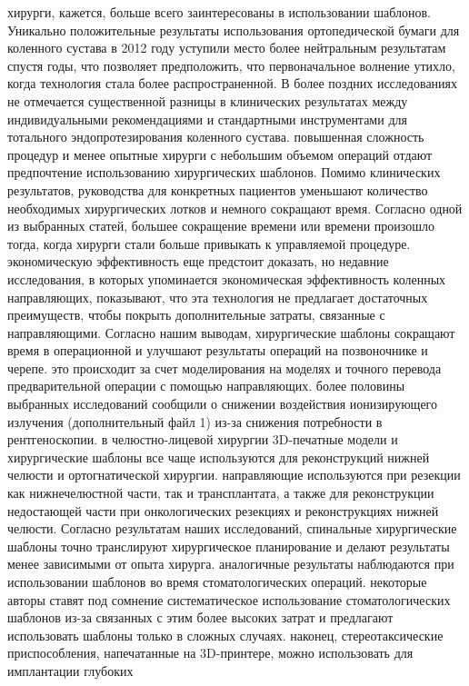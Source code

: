хирурги, кажется, больше всего заинтересованы в использовании шаблонов.
Уникально положительные результаты использования ортопедической бумаги для
коленного сустава в 2012 году уступили место более нейтральным результатам
спустя годы, что позволяет предположить, что первоначальное волнение утихло,
когда технология стала более распространенной. В более поздних исследованиях не
отмечается существенной разницы в клинических результатах между индивидуальными
рекомендациями и стандартными инструментами для тотального эндопротезирования
коленного сустава. повышенная сложность процедур и менее опытные хирурги с
небольшим объемом операций отдают предпочтение использованию хирургических
шаблонов. Помимо клинических результатов, руководства для конкретных пациентов
уменьшают количество необходимых хирургических лотков и немного сокращают время.
Согласно одной из выбранных статей, большее сокращение времени или времени
произошло тогда, когда хирурги стали больше привыкать к управляемой процедуре.
экономическую эффективность еще предстоит доказать, но недавние исследования, в
которых упоминается экономическая эффективность коленных направляющих,
показывают, что эта технология не предлагает достаточных преимуществ, чтобы
покрыть дополнительные затраты, связанные с направляющими. Согласно нашим
выводам, хирургические шаблоны сокращают время в операционной и улучшают
результаты операций на позвоночнике и черепе. это происходит за счет
моделирования на моделях и точного перевода предварительной операции с помощью
направляющих. более половины выбранных исследований сообщили о снижении
воздействия ионизирующего излучения (дополнительный файл 1) из-за снижения
потребности в рентгеноскопии. в челюстно-лицевой хирургии 3D-печатные модели и
хирургические шаблоны все чаще используются для реконструкций нижней челюсти и
ортогнатической хирургии. направляющие используются при резекции как
нижнечелюстной части, так и трансплантата, а также для реконструкции недостающей
части при онкологических резекциях и реконструкциях нижней челюсти. Согласно
результатам наших исследований, спинальные хирургические шаблоны точно
транслируют хирургическое планирование и делают результаты менее зависимыми от
опыта хирурга. аналогичные результаты наблюдаются при использовании шаблонов во
время стоматологических операций. некоторые авторы ставят под сомнение
систематическое использование стоматологических шаблонов из-за связанных с этим
более высоких затрат и предлагают использовать шаблоны только в сложных случаях.
наконец, стереотаксические приспособления, напечатанные на 3D-принтере, можно
использовать для имплантации глубоких

